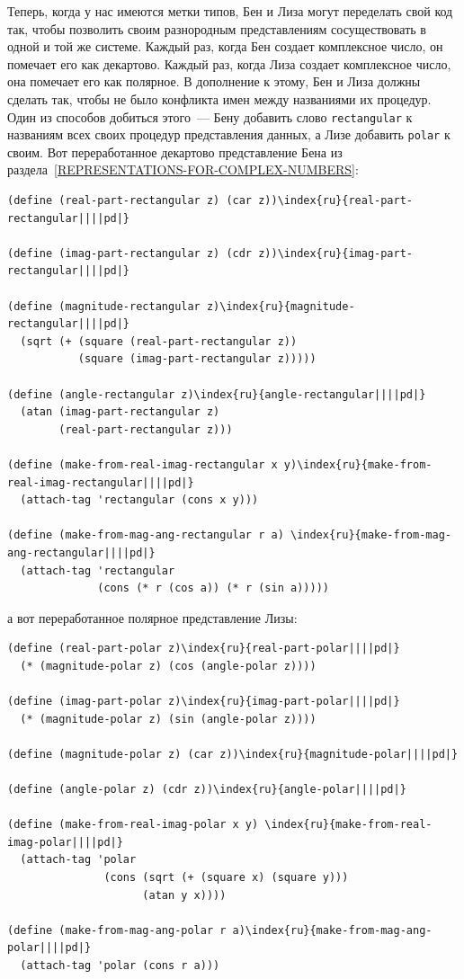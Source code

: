Теперь, когда у нас имеются метки типов, Бен и Лиза 
могут переделать свой код так, чтобы позволить своим разнородным
представлениям сосуществовать в одной и той же системе.  Каждый раз,
когда Бен создает комплексное число, он помечает его как декартово.
Каждый раз, когда Лиза создает комплексное число, она помечает его
как полярное.  В дополнение к этому, Бен и Лиза должны сделать так,
чтобы не было конфликта имен между названиями их процедур.  Один из
способов добиться этого~--- Бену добавить слово {\tt rectangular} к
названиям всех своих процедур представления данных, а Лизе добавить
{\tt polar} к своим.  Вот переработанное декартово представление 
Бена
из раздела~\ref{REPRESENTATIONS-FOR-COMPLEX-NUMBERS}:

\begin{Verbatim}[fontsize=\small]
(define (real-part-rectangular z) (car z))\index{ru}{real-part-rectangular||||pd|}

(define (imag-part-rectangular z) (cdr z))\index{ru}{imag-part-rectangular||||pd|}

(define (magnitude-rectangular z)\index{ru}{magnitude-rectangular||||pd|}
  (sqrt (+ (square (real-part-rectangular z))
           (square (imag-part-rectangular z)))))

(define (angle-rectangular z)\index{ru}{angle-rectangular||||pd|}
  (atan (imag-part-rectangular z)
        (real-part-rectangular z)))

(define (make-from-real-imag-rectangular x y)\index{ru}{make-from-real-imag-rectangular||||pd|}
  (attach-tag 'rectangular (cons x y)))

(define (make-from-mag-ang-rectangular r a) \index{ru}{make-from-mag-ang-rectangular||||pd|}
  (attach-tag 'rectangular
              (cons (* r (cos a)) (* r (sin a)))))
\end{Verbatim}
а вот переработанное полярное представление Лизы:

\begin{Verbatim}[fontsize=\small]
(define (real-part-polar z)\index{ru}{real-part-polar||||pd|}
  (* (magnitude-polar z) (cos (angle-polar z))))

(define (imag-part-polar z)\index{ru}{imag-part-polar||||pd|}
  (* (magnitude-polar z) (sin (angle-polar z))))

(define (magnitude-polar z) (car z))\index{ru}{magnitude-polar||||pd|}

(define (angle-polar z) (cdr z))\index{ru}{angle-polar||||pd|}

(define (make-from-real-imag-polar x y) \index{ru}{make-from-real-imag-polar||||pd|}
  (attach-tag 'polar
               (cons (sqrt (+ (square x) (square y)))
                     (atan y x))))

(define (make-from-mag-ang-polar r a)\index{ru}{make-from-mag-ang-polar||||pd|}
  (attach-tag 'polar (cons r a)))
\end{Verbatim}

